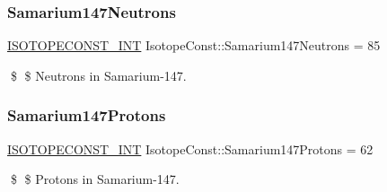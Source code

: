 \subsubsection{\texorpdfstring{Samarium147\+Neutrons}{Samarium147Neutrons}}
{\footnotesize\ttfamily \mbox{\hyperlink{group___isotope_const-_macros_ga5f18360b3e99483a35c32d789e62621c}{I\+S\+O\+T\+O\+P\+E\+C\+O\+N\+S\+T\+\_\+\+I\+NT}} Isotope\+Const\+::\+Samarium147\+Neutrons = 85}

\$ \$ Neutrons in Samarium-\/147. \mbox{\label{group___isotope_const-_samarium-_sm147_ga08d4de69944309be1e4e5a78127f49b2}} 
\subsubsection{\texorpdfstring{Samarium147\+Protons}{Samarium147Protons}}
{\footnotesize\ttfamily \mbox{\hyperlink{group___isotope_const-_macros_ga5f18360b3e99483a35c32d789e62621c}{I\+S\+O\+T\+O\+P\+E\+C\+O\+N\+S\+T\+\_\+\+I\+NT}} Isotope\+Const\+::\+Samarium147\+Protons = 62}

\$ \$ Protons in Samarium-\/147. 